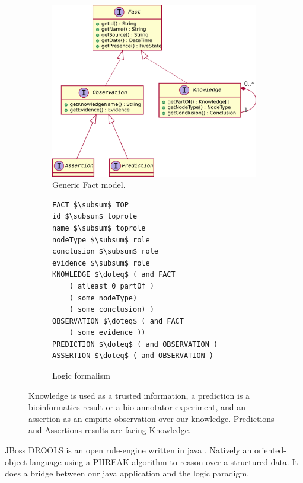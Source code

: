 \documentclass{llncs}
\newcommand{\subsum}{\mathop{\raisebox{1ex}{$\cdot$}\!\!\!\!\leq}}
\begin{document}
\begin{figure}[H]
    \centering
    \begin{subfigure}{0.6\textwidth}
    \includegraphics[width=\textwidth]{plantuml/fact.pdf}
    \caption{Generic Fact model.}
    \label{fig:fact}
    \end{subfigure}
    \hfill{}
    \begin{subfigure}{0.3\textwidth}
        \begin{lstlisting}[mathescape, basicstyle=\fontfamily{lmvtt}\selectfont]
FACT $\subsum$ TOP
id $\subsum$ toprole
name $\subsum$ toprole
nodeType $\subsum$ role
conclusion $\subsum$ role
evidence $\subsum$ role
KNOWLEDGE $\doteq$ ( and FACT
    ( atleast 0 partOf )
    ( some nodeType)
    ( some conclusion) )
OBSERVATION $\doteq$ ( and FACT
    ( some evidence ))
PREDICTION $\doteq$ ( and OBSERVATION )
ASSERTION $\doteq$ ( and OBSERVATION )
        \end{lstlisting}
    \caption{Logic formalism}
    \end{subfigure}
    \caption{Knowledge is used as a trusted information, a prediction is a bioinformatics result or a bio-annotator experiment, and an assertion as an empiric observation over our knowledge. Predictions and Assertions results are facing Knowledge.}
\end{figure}

JBoss DROOLS is an open rule-engine written in java \cite{proctor2008drools}. Natively an oriented-object language using a PHREAK algorithm \cite{phreak} to reason over a structured data. It does a  bridge between our java application and the logic paradigm.
\end{document}
